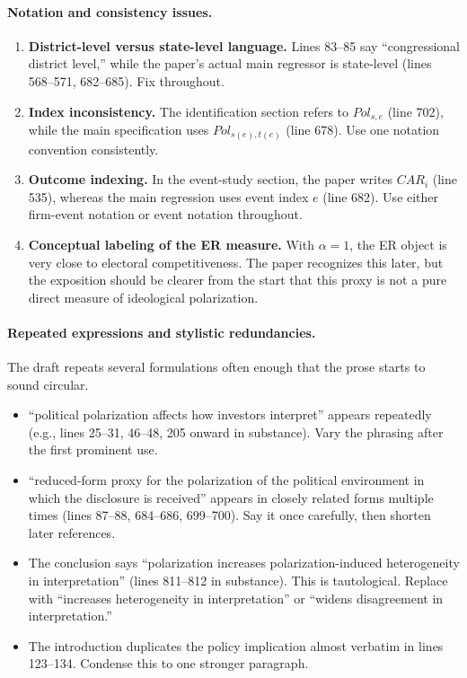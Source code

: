 \documentclass[12pt]{article}
\begin{document}
\paragraph{Notation and consistency issues.}

\begin{enumerate}
    \item \textbf{District-level versus state-level language.} Lines 83--85 say ``congressional district level,'' while the paper's actual main regressor is state-level (lines 568--571, 682--685). Fix throughout.
    \item \textbf{Index inconsistency.} The identification section refers to $\textit{Pol}_{s,e}$ (line 702), while the main specification uses $\textit{Pol}_{s(e),t(e)}$ (line 678). Use one notation convention consistently.
    \item \textbf{Outcome indexing.} In the event-study section, the paper writes $CAR_i$ (line 535), whereas the main regression uses event index $e$ (line 682). Use either firm-event notation or event notation throughout.
    \item \textbf{Conceptual labeling of the ER measure.} With $\alpha=1$, the ER object is very close to electoral competitiveness. The paper recognizes this later, but the exposition should be clearer from the start that this proxy is not a pure direct measure of ideological polarization.
\end{enumerate}

\paragraph{Repeated expressions and stylistic redundancies.}
The draft repeats several formulations often enough that the prose starts to sound circular.

\begin{itemize}
    \item ``political polarization affects how investors interpret'' appears repeatedly (e.g., lines 25--31, 46--48, 205 onward in substance). Vary the phrasing after the first prominent use.
    \item ``reduced-form proxy for the polarization of the political environment in which the disclosure is received'' appears in closely related forms multiple times (lines 87--88, 684--686, 699--700). Say it once carefully, then shorten later references.
    \item The conclusion says ``polarization increases polarization-induced heterogeneity in interpretation'' (lines 811--812 in substance). This is tautological. Replace with ``increases heterogeneity in interpretation'' or ``widens disagreement in interpretation.''
    \item The introduction duplicates the policy implication almost verbatim in lines 123--134. Condense this to one stronger paragraph.
\end{itemize}
\end{document}
